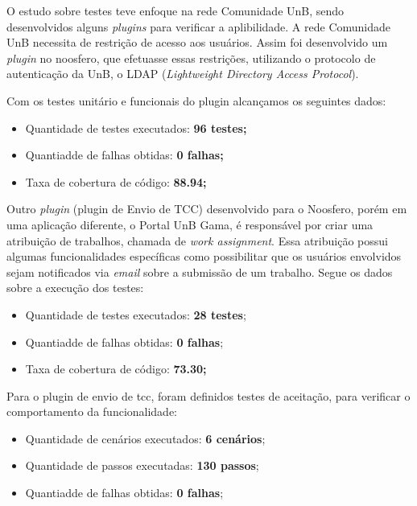 
O estudo sobre testes teve enfoque na rede Comunidade UnB, sendo desenvolvidos alguns \textit{plugins} para verificar a aplibilidade. A rede Comunidade UnB  necessita de restrição de acesso aos usuários. 
%
Assim foi desenvolvido um \textit{plugin} no noosfero, que efetuasse essas restrições, utilizando o protocolo de autenticação da UnB, o LDAP (\textit{Lightweight Directory Access Protocol}).

Com os testes unitário e funcionais do plugin alcançamos os seguintes dados:

\begin{itemize}
\item Quantidade de testes executados: \textbf{96 testes;}
\item Quantiadde de falhas obtidas: \textbf{0 falhas;}
\item Taxa de cobertura de código: \textbf{88.94;}
\end{itemize}

Outro \textit{plugin} (plugin de Envio de TCC) desenvolvido para o Noosfero, porém em uma aplicação diferente, o Portal UnB Gama, é responsável por criar uma atribuição de trabalhos, chamada de \textit{work assignment}. Essa atribuição possui algumas funcionalidades específicas como possibilitar que os usuários envolvidos sejam notificados via \textit{email} sobre a submissão de um trabalho. Segue os dados sobre a execução dos testes:

\begin{itemize}
\item Quantidade de testes executados: \textbf{28 testes};
\item Quantiadde de falhas obtidas: \textbf{0 falhas};
\item Taxa de cobertura de código: \textbf{73.30;}
\end{itemize}

Para o plugin de envio de tcc, foram definidos testes de aceitação, para verificar o comportamento da funcionalidade:

\begin{itemize}
\item Quantidade de cenários executados: \textbf{6 cenários};
\item Quantidade de passos executadas: \textbf{130 passos};
\item Quantiadde de falhas obtidas: \textbf{0 falhas};
\end{itemize}

